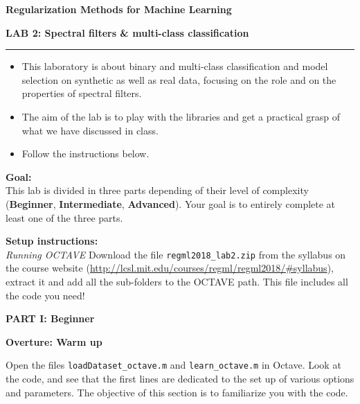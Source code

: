 \documentclass[DIN, pagenumber=false, fontsize=11pt, parskip=half]{scrartcl}
\newcommand{\mytitle}[1]{{\noindent\LARGE\textbf{#1}}}
\newcommand{\mysection}[1]{\noindent\large\textbf{#1}}
\begin{document}
\noindent\textbf{Regularization Methods for Machine Learning}

\mytitle{\center LAB 2: Spectral filters \& multi-class classification}\\
\rule{\textwidth}{1pt}
\begin{itemize}\itemsep1pt \parskip0pt 
  \item This laboratory is about binary and multi-class classification and model selection on synthetic as well as real data, focusing on the role and on the properties of spectral filters.
  \item The aim of the lab is to play with the libraries and get a practical grasp of what we have discussed in class.
  \item Follow the instructions below.  
\end{itemize}

\begin{framed}
\textbf{\textbf{Goal}:} \\
This lab is divided in three parts depending of their level of complexity (\textbf{Beginner}, \textbf{Intermediate}, \textbf{Advanced}). Your goal is to entirely complete at least one of the three parts.
\end{framed}

\begin{framed}
\textbf{\textbf{Setup instructions}:} \\
\textit{Running OCTAVE}
 Download the file \texttt{regml2018\_lab2.zip} from the syllabus on the course website (\url{http://lcsl.mit.edu/courses/regml/regml2018/\#syllabus}), extract it and add all the sub-folders to the OCTAVE path. This file includes all the code you need!
\end{framed}

\pagebreak
\begin{center}
\large\textbf{PART I: Beginner}
\end{center}

\mysection{Overture: Warm up}

\noindent Open the files \texttt{loadDataset\_octave.m} and \texttt{learn\_octave.m} in Octave.
Look at the code, and see that the first lines are dedicated to the set up of various options and parameters.
The objective of this section is to familiarize you with the code.
\end{document}
